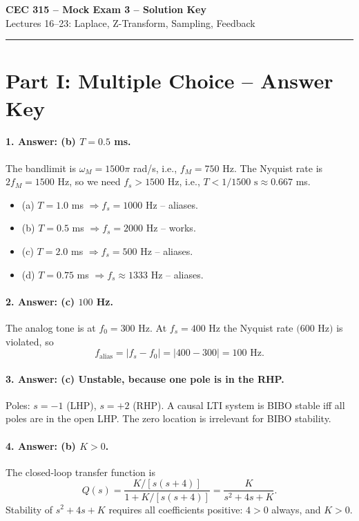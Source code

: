 \documentclass[11pt]{article}
\begin{document}
\begin{center}
    {\LARGE \textbf{CEC 315 -- Mock Exam 3 -- Solution Key}}\\[2pt]
    Lectures 16--23: Laplace, Z-Transform, Sampling, Feedback
\end{center}

\vspace{4pt}
\hrule
\vspace{10pt}

\section*{Part I: Multiple Choice -- Answer Key}

\paragraph{1. Answer: (b) $T = 0.5$ ms.}
The bandlimit is $\omega_M = 1500\pi$ rad/s, i.e., $f_M = 750$ Hz. The Nyquist rate is $2f_M = 1500$ Hz, so we need $f_s > 1500$ Hz, i.e., $T < 1/1500\text{ s}\approx 0.667$ ms.
\begin{itemize}[leftmargin=*, itemsep=0pt]
    \item (a) $T=1.0$ ms $\Rightarrow f_s=1000$ Hz -- aliases.
    \item (b) $T=0.5$ ms $\Rightarrow f_s=2000$ Hz -- works. \checkmark
    \item (c) $T=2.0$ ms $\Rightarrow f_s=500$ Hz -- aliases.
    \item (d) $T=0.75$ ms $\Rightarrow f_s\approx 1333$ Hz -- aliases.
\end{itemize}

\paragraph{2. Answer: (c) $100$ Hz.}
The analog tone is at $f_0 = 300$ Hz. At $f_s=400$ Hz the Nyquist rate $(600$ Hz$)$ is violated, so
\[
f_{\text{alias}} = |f_s - f_0| = |400 - 300| = 100\text{ Hz}.
\]

\paragraph{3. Answer: (c) Unstable, because one pole is in the RHP.}
Poles: $s=-1$ (LHP), $s=+2$ (RHP). A causal LTI system is BIBO stable iff all poles are in the open LHP. The zero location is irrelevant for BIBO stability.

\paragraph{4. Answer: (b) $K > 0$.}
The closed-loop transfer function is
\[
Q(s) = \frac{K/[s(s+4)]}{1 + K/[s(s+4)]} = \frac{K}{s^2 + 4s + K}.
\]
Stability of $s^2 + 4s + K$ requires all coefficients positive: $4>0$ always, and $K>0$.
\end{document}

